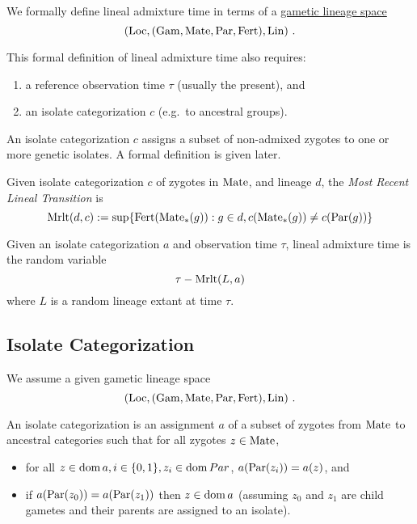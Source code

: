 We formally define lineal admixture time in terms of a
\href{https://popgen.es/0iV47kWzQAuyONrIDG538k3x3Qc/0.3/}{gametic
lineage space}
\cite{dsi:0i/0.3}
\[
(\mathrm{Loc}, (\mathrm{Gam}, \mathrm{Mate}, \mathrm{Par}, \mathrm{Fert}), \mathrm{Lin})
\text{ .}
\]

This formal definition of lineal admixture time also requires:

\begin{enumerate}
\item
  a reference observation time \(\tau\) (usually the present), and
\item
  an isolate categorization \(c\) (e.g.~to ancestral groups).
\end{enumerate}

An isolate categorization \(c\) assigns a subset of non-admixed zygotes
to one or more genetic isolates. A formal definition is given later.

Given isolate categorization \(c\) of zygotes in \(\mathrm{Mate}\), and lineage
\(d\), the \emph{Most Recent Lineal Transition} is
$$
\mathrm{Mrlt}(d,c) := \sup\{ \mathrm{Fert}(\mathrm{Mate}_*(g)) : g \in d, c(\mathrm{Mate}_*(g)) \not= c(\mathrm{Par}(g)) \}
$$

Given an isolate categorization \(a\) and observation time \(\tau\),
lineal admixture time is the random variable
$$
\tau - \mathrm{Mrlt}(L, a)
$$
where $L$ is a random lineage extant at time $\tau$.


\subsection{Isolate Categorization}

We assume a given gametic lineage space
$$
(\mathrm{Loc}, (\mathrm{Gam}, \mathrm{Mate}, \mathrm{Par}, \mathrm{Fert}), \mathrm{Lin})
\text{ .}
$$

An isolate categorization is an assignment $a$ of a subset of zygotes
from $\mathrm{Mate}$ to ancestral categories such that for all zygotes
$z \in \mathrm{Mate}$,

\begin{itemize}
\item
  for all \(z \in \operatorname{dom}{ a}, i \in \{0, 1\}, z_i \in \operatorname{dom}{ Par}\),
  \(a(\mathrm{Par}(z_i)) = a(z)\), and
\item
  if \(a(\mathrm{Par}(z_0)) = a(\mathrm{Par}(z_1))\) then \(z \in \operatorname{dom}{ a}\) (assuming
  \(z_0\) and \(z_1\) are child gametes and their parents are assigned
  to an isolate).
\end{itemize}


\printbibliography %
